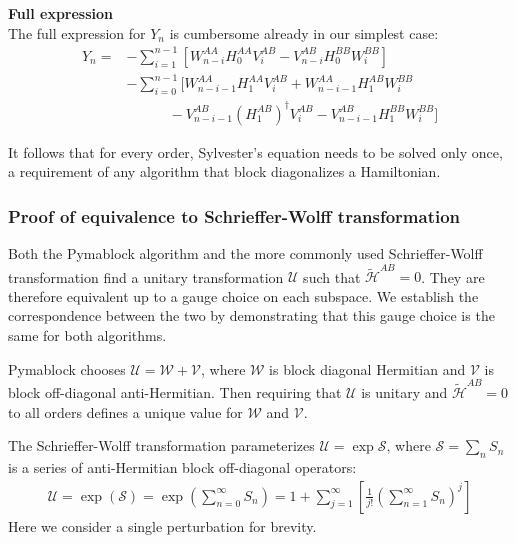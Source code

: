 \begin{framed}
\textbf{Full expression}\\
The full expression for $Y_n$ is cumbersome already in our simplest case:
%
\begin{align}
\label{y_n}
Y_n=&-
\sum_{i=1}^{n-1}\left[W_{n-i}^{AA}H_0^{AA}V_i^{AB}-V_{n-i}^{AB}
H_0^{BB}W_i^{BB}\right] \\
&-\sum_{i=0}^{n-1}\bigg[W_{n-i-1}^{AA}H_1^{AA}V_i^{AB}+W_{n-i-1}^{AA}
H_1^{AB}W_i^{BB} \\
&\quad \quad \quad -V_{n-i-1}^{AB}(H_1^{AB})^\dagger V_i^{AB} -V_{n-i-1}^{AB}
H_1^{BB}W_i^{BB}\bigg]
\end{align}
\end{framed}
%
It follows that for every order, Sylvester's equation needs to be solved
only once, a requirement of any algorithm that block diagonalizes a Hamiltonian.

\subsubsection{Proof of equivalence to Schrieffer-Wolff transformation}

Both the Pymablock algorithm and the more commonly used Schrieffer-Wolff
transformation find a unitary transformation $\mathcal{U}$ such that
$\tilde{\mathcal{H}}^{AB}=0$.
They are therefore equivalent up to a gauge choice on each subspace.
We establish the correspondence between the two by demonstrating that this gauge
choice is the same for both algorithms.

Pymablock chooses $\mathcal{U}=\mathcal{W}+\mathcal{V}$, where $\mathcal{W}$ is
block diagonal Hermitian and $\mathcal{V}$ is block off-diagonal
anti-Hermitian.
Then requiring that $\mathcal{U}$ is unitary and $\tilde{\mathcal{H}}^{AB}=0$
to all orders defines a unique value for $\mathcal{W}$ and $\mathcal{V}$.

The Schrieffer-Wolff transformation parameterizes $\mathcal{U} = \exp
\mathcal{S}$, where $\mathcal{S} = \sum_n S_n$ is a series of
anti-Hermitian block off-diagonal operators:
%
\begin{align}
\label{exp_s_expansion}
\mathcal{U} = \exp{\left(\mathcal{S}\right)}=\exp{\left(\sum_{n=0}^\infty
S_n\right)} = 1+\sum_{j=1}^\infty \left[\frac{1}{j!}
\left(\sum_{n=1}^\infty S_n\right)^j\right]
\end{align}
%
Here we consider a single perturbation for brevity.

